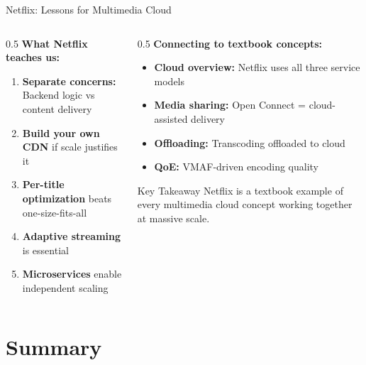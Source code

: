 \documentclass[aspectratio=169,12pt]{beamer}
\begin{document}
\begin{frame}{Netflix: Lessons for Multimedia Cloud}
    \begin{columns}
        \begin{column}{0.5\textwidth}
            \textbf{What Netflix teaches us:}
            \begin{enumerate}
                \item \textbf{Separate concerns:} Backend logic vs content delivery
                \item \textbf{Build your own CDN} if scale justifies it
                \item \textbf{Per-title optimization} beats one-size-fits-all
                \item \textbf{Adaptive streaming} is essential
                \item \textbf{Microservices} enable independent scaling
            \end{enumerate}
        \end{column}
        \begin{column}{0.5\textwidth}
            \textbf{Connecting to textbook concepts:}
            \begin{itemize}
                \item \textbf{Cloud overview:} Netflix uses all three service models
                \item \textbf{Media sharing:} Open Connect = cloud-assisted delivery
                \item \textbf{Offloading:} Transcoding offloaded to cloud
                \item \textbf{QoE:} VMAF-driven encoding quality
            \end{itemize}
            
            \vspace{0.3cm}
            \begin{alertblock}{Key Takeaway}
                Netflix is a textbook example of every multimedia cloud concept working together at massive scale.
            \end{alertblock}
        \end{column}
    \end{columns}
\end{frame}

\section{Summary}
\end{document}
